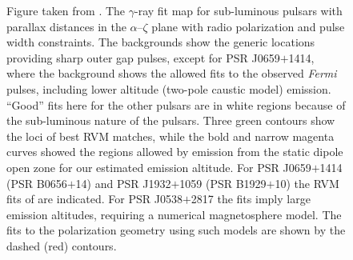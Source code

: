 \begin{figure}[htbp]
\caption[The $\gamma$-ray fit map for sub-luminous pulsars with parallax
distances in the $\alpha$--$\zeta$ plane with radio polarization and pulse
width constraints]{ \label{plx_const} 
Figure taken from \cite{romani2011sub}.
The $\gamma$-ray fit map for sub-luminous pulsars with parallax 
distances in the $\alpha$--$\zeta$ plane with radio polarization and pulse
width constraints.
The backgrounds show the generic locations providing
sharp outer gap pulses, except for PSR J0659$+$1414, where the background shows the
allowed fits to the observed {\it Fermi} pulses, including lower altitude 
(two-pole caustic model)
emission. 
``Good'' fits here for the other pulsars are in white regions because
of the sub-luminous nature of the pulsars.
Three green contours show the loci of best RVM matches, while the
bold and narrow magenta curves showed the regions allowed by emission from
the static dipole open zone for our estimated emission altitude. For PSR J0659$+$1414 (PSR B0656$+$14)
and PSR J1932$+$1059 (PSR B1929$+$10) the RVM fits of \citet{everett2001emission} are indicated.
For PSR J0538$+$2817 the fits imply large emission altitudes, requiring
a numerical magnetosphere model. The fits to the polarization geometry using
such models are shown by the dashed (red) contours.
}
\end{figure}

